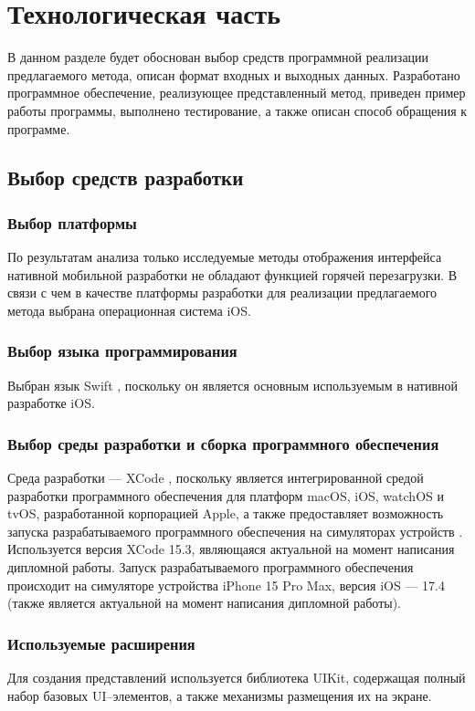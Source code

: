 \section{Технологическая часть}

В данном разделе будет обоснован выбор средств программной реализации предлагаемого метода, описан формат входных и выходных данных. 
Разработано программное обеспечение, реализующее представленный метод, приведен пример работы программы, выполнено тестирование, а также описан способ обращения к программе.

\subsection{Выбор средств разработки}

\subsubsection{Выбор платформы}
По результатам анализа только исследуемые методы отображения интерфейса нативной мобильной разработки не обладают функцией горячей перезагрузки. 
В связи с чем в качестве платформы разработки для реализации предлагаемого метода выбрана операционная система iOS.

\subsubsection{Выбор языка программирования}
Выбран язык Swift \cite{swift}, поскольку он является основным используемым в нативной разработке iOS.

\subsubsection{Выбор среды разработки и сборка программного обеспечения}
Среда разработки --- XCode \cite{xcode}, поскольку является интегрированной средой разработки программного обеспечения для платформ macOS, iOS, watchOS и tvOS, разработанной корпорацией Apple, а также предоставляет возможность запуска разрабатываемого программного обеспечения на симуляторах устройств \cite{simulator}. 
Используется версия XCode 15.3, являющаяся актуальной на момент написания дипломной работы.
Запуск разрабатываемого программного обеспечения происходит на симуляторе устройства iPhone 15 Pro Max, версия iOS --- 17.4 (также является актуальной на момент написания дипломной работы).

\subsubsection{Используемые расширения}
Для создания представлений используется библиотека UIKit, содержащая полный набор базовых UI--элементов, а также механизмы размещения их на экране. 


